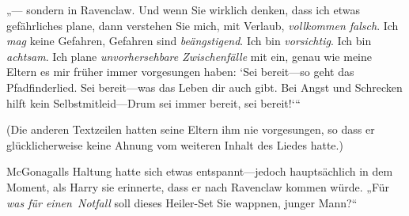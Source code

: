 „— sondern in Ravenclaw. Und wenn Sie wirklich denken, dass ich etwas gefährliches plane, dann verstehen Sie mich, mit Verlaub, \emph{vollkommen falsch}. Ich \emph{mag} keine Gefahren, Gefahren sind \emph{beängstigend}. Ich bin \emph{vorsichtig}. Ich bin \emph{achtsam}. Ich plane \emph{unvorhersehbare Zwischenfälle} mit ein, genau wie meine Eltern es mir früher immer vorgesungen haben: ‘Sei bereit—so geht das Pfadfinderlied. Sei bereit—was das Leben dir auch gibt. Bei Angst und Schrecken hilft kein Selbstmitleid—Drum sei immer bereit, sei bereit!‘“

(Die anderen Textzeilen hatten seine Eltern ihm nie vorgesungen, so dass er glücklicherweise keine Ahnung vom weiteren Inhalt des Liedes hatte.)

McGonagalls Haltung hatte sich etwas entspannt—jedoch hauptsächlich in dem Moment, als Harry sie erinnerte, dass er nach Ravenclaw kommen würde. „Für \emph{was für einen\linebreak\ Notfall} soll dieses Heiler-Set Sie wappnen, junger Mann?“


